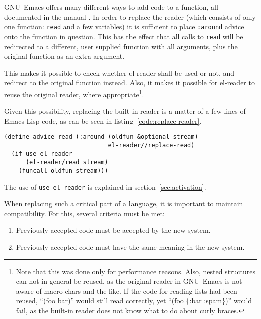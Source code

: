 \documentclass[a4paper,10pt,twoside]{report}
\newcommand{\el}{Emacs Lisp}
\newcommand{\elr}{el-reader}
\newcommand{\sym}[1]{\texttt{#1}}
\newcommand{\fun}[1]{\texttt{#1}}
\newcommand{\emacs}{GNU~Emacs}
\begin{document}
\emacs{} offers many different ways to add code to a function, all documented in
the manual \cite[Section 12.11 ``Advising Emacs Lisp
Functions'']{elisp-reference}.  In order to replace the reader (which consists
of only one function: \fun{read} and a few variables) it is sufficient to place
\sym{:around} advice onto the function in question.  This has the effect that
all calls to \fun{read} will be redirected to a different, user supplied
function with all arguments, plus the original function as an extra argument.

This makes it possible to check whether \elr{} shall be used or not, and
redirect to the original function instead.  Also, it makes it possible for
\elr{} to reuse the original reader, where appropriate\footnote{Note that this
  was done only for performance reasons.  Also, nested structures can not in
  general be reused, as the original reader in \emacs{} is not aware of macro
  chars and the like.  If the code for reading lists had been reused, ``(foo
  bar)'' would still read correctly, yet ``(foo \{:bar :spam\})'' would fail, as
  the built-in reader does not know what to do about curly braces.}.

Given this possibility, replacing the built-in reader is a matter of a few lines
of \el{} code, as can be seen in listing~\ref{code:replace-reader}.

\begin{lstlisting}[style=lispcode,caption={Replacing the built-in
    reader},label={code:replace-reader}]
(define-advice read (:around (oldfun &optional stream)
                             el-reader//replace-read)
  (if use-el-reader
      (el-reader/read stream)
    (funcall oldfun stream)))
\end{lstlisting}

The use of \sym{use-el-reader} is explained in section~\ref{sec:activation}.


When replacing such a critical part of a language, it is important to maintain
compatibility.  For this, several criteria must be met:

\begin{enumerate}
\item Previously accepted code must be accepted by the new system.
\item Previously accepted code must have the same meaning in the new system.
\end{enumerate}
\end{document}
